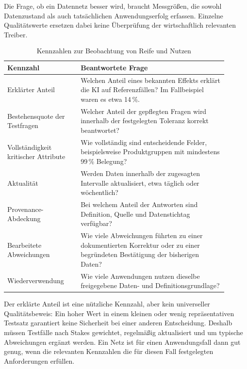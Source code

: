 \documentclass[a4paper,12pt,twoside]{report}
\theoremstyle{definition}
\begin{document}
Die Frage, ob ein Datennetz besser wird, braucht Messgrößen, die sowohl Datenzustand als auch tatsächlichen Anwendungserfolg erfassen. Einzelne Qualitätswerte ersetzen dabei keine Überprüfung der wirtschaftlich relevanten Treiber.

\begin{table}[htbp]
\centering
\small
\caption{Kennzahlen zur Beobachtung von Reife und Nutzen}
\label{tab:metrics}
\begin{tabular}{p{0.30\linewidth}p{0.60\linewidth}}
\toprule
\textbf{Kennzahl} & \textbf{Beantwortete Frage} \\
\midrule
Erklärter Anteil & Welchen Anteil eines bekannten Effekts erklärt die KI auf Referenzfällen? Im Fallbeispiel waren es etwa 14\,\%. \\
Bestehensquote der Testfragen & Welcher Anteil der gepflegten Fragen wird innerhalb der festgelegten Toleranz korrekt beantwortet? \\
Vollständigkeit kritischer Attribute & Wie vollständig sind entscheidende Felder, beispielsweise Produktgruppen mit mindestens 99\,\% Belegung? \\
Aktualität & Werden Daten innerhalb der zugesagten Intervalle aktualisiert, etwa täglich oder wöchentlich? \\
Provenance-Abdeckung & Bei welchem Anteil der Antworten sind Definition, Quelle und Datenstichtag verfügbar? \\
Bearbeitete Abweichungen & Wie viele Abweichungen führten zu einer dokumentierten Korrektur oder zu einer begründeten Bestätigung der bisherigen Daten? \\
Wiederverwendung & Wie viele Anwendungen nutzen dieselbe freigegebene Daten- und Definitionsgrundlage? \\
\bottomrule
\end{tabular}
\end{table}

Der erklärte Anteil ist eine nützliche Kennzahl, aber kein universeller Qualitätsbeweis: Ein hoher Wert in einem kleinen oder wenig repräsentativen Testsatz garantiert keine Sicherheit bei einer anderen Entscheidung. Deshalb müssen Testfälle nach Stakes gewichtet, regelmäßig aktualisiert und um typische Abweichungen ergänzt werden. Ein Netz ist für einen Anwendungsfall dann gut genug, wenn die relevanten Kennzahlen die für diesen Fall festgelegten Anforderungen erfüllen.
\end{document}
